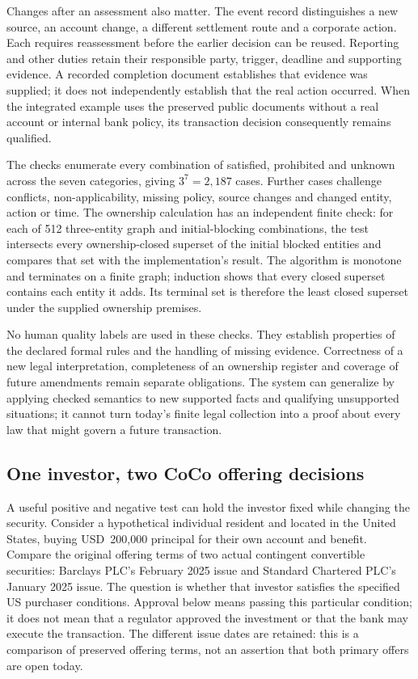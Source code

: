 Changes after an assessment also matter. The event record distinguishes a new
source, an account change, a different settlement route and a corporate action.
Each requires reassessment before the earlier decision can be reused. Reporting
and other duties retain their responsible party, trigger, deadline and supporting
evidence. A recorded completion document establishes that evidence was supplied;
it does not independently establish that the real action occurred. When the
integrated example uses the preserved public documents without a real account
or internal bank policy, its transaction decision consequently remains qualified.

The checks enumerate every combination of satisfied, prohibited and unknown
across the seven categories, giving $3^7=2{,}187$ cases. Further cases challenge
conflicts, non-applicability, missing policy, source changes and changed entity,
action or time. The ownership calculation has an independent finite check: for
each of 512 three-entity graph and initial-blocking combinations, the test
intersects every ownership-closed superset of the initial blocked entities and
compares that set with the implementation's result. The algorithm is monotone
and terminates on a finite graph; induction shows that every closed superset
contains each entity it adds. Its terminal set is therefore the least closed
superset under the supplied ownership premises.

No human quality labels are used in these checks. They establish properties of
the declared formal rules and the handling of missing evidence. Correctness of
a new legal interpretation, completeness of an ownership register and coverage
of future amendments remain separate obligations. The system can generalize by
applying checked semantics to new supported facts and qualifying unsupported
situations; it cannot turn today's finite legal collection into a proof about
every law that might govern a future transaction.

\subsection{One investor, two CoCo offering decisions}
\label{sec:coco-purchaser-cases}

A useful positive and negative test can hold the investor fixed while changing
the security. Consider a hypothetical individual resident and located in the
United States, buying USD~200,000 principal for their own account and benefit.
Compare the original offering terms of two actual contingent convertible
securities: Barclays PLC's February 2025 issue and Standard Chartered PLC's
January 2025 issue. The question is whether that investor satisfies the
specified US purchaser conditions. Approval below means passing this particular
condition; it does not mean that a regulator approved the investment or that
the bank may execute the transaction. The different issue dates are retained:
this is a comparison of preserved offering terms, not an assertion that both
primary offers are open today.

